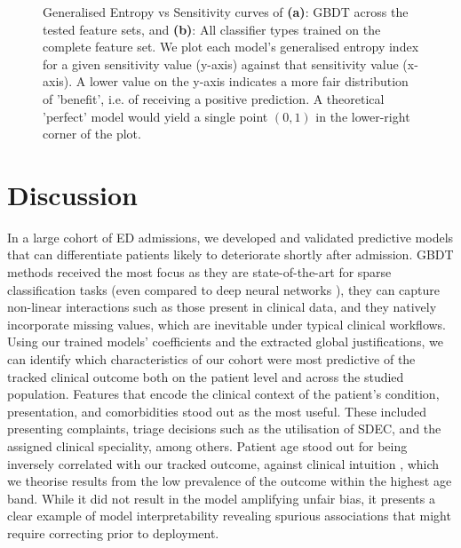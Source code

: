 \documentclass[fleqn,10pt]{wlscirep}
\begin{document}
\begin{figure}[htbp]
    \centering
    
    \caption{Generalised Entropy vs Sensitivity curves of \textbf{(a)}: GBDT across the tested feature sets, and \textbf{(b)}: All classifier types trained on the complete feature set. We plot each model's generalised entropy index for a given sensitivity value (y-axis) against that sensitivity value (x-axis). A lower value on the y-axis indicates a more fair distribution of 'benefit', i.e. of receiving a positive prediction. A theoretical 'perfect' model would yield a single point $(0,1)$ in the lower-right corner of the plot. }
    \label{fig:entropy}
\end{figure}

\section*{Discussion} In a large cohort of ED admissions, we developed and validated predictive models that can differentiate patients likely to deteriorate shortly after admission. GBDT methods received the most focus as they are state-of-the-art for sparse classification tasks (even compared to deep neural networks \cite{Borisov21}), they can capture non-linear interactions such as those present in clinical data, and they natively incorporate missing values, which are inevitable under typical clinical workflows. Using our trained models' coefficients and the extracted global justifications, we can identify which characteristics of our cohort were most predictive of the tracked clinical outcome both on the patient level and across the studied population. Features that encode the clinical context of the patient's condition, presentation, and comorbidities stood out as the most useful. These included presenting complaints, triage decisions such as the utilisation of SDEC, and the assigned clinical speciality, among others. Patient age stood out for being inversely correlated with our tracked outcome, against clinical intuition \cite{Metlay97}, which we theorise results from the low prevalence of the outcome within the highest age band. While it did not result in the model amplifying unfair bias, it presents a clear example of model interpretability revealing spurious associations that might require correcting prior to deployment.
\end{document}
